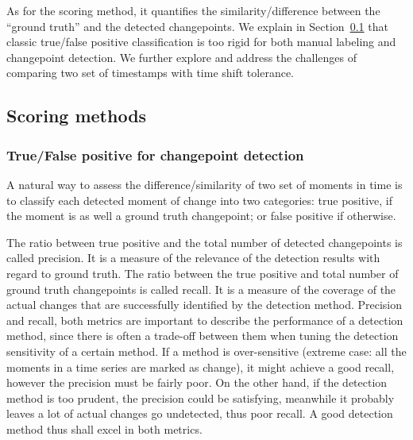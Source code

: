 As for the scoring method, it quantifies the similarity/difference between the ``ground truth'' and the detected changepoints.
We explain in Section~\ref{sec:score} that classic true/false positive classification is too rigid for both manual labeling and changepoint detection.
We further explore and address the challenges of comparing two set of timestamps with time shift tolerance.

\subsection{Scoring methods}
\label{sec:score}

\subsubsection{True/False positive for changepoint detection}

A natural way to assess the difference/similarity of two set of moments in time is to classify each detected moment of change into two categories: true positive, if the moment is as well a ground truth changepoint; or false positive if otherwise.

The ratio between true positive and the total number of detected changepoints is called precision.
It is a measure of the relevance of the detection results with regard to ground truth.
The ratio between the true positive and total number of ground truth changepoints is called recall.
It is a measure of the coverage of the actual changes that are successfully identified by the detection method.
Precision and recall, both metrics are important to describe the performance of a detection method, since there is often a trade-off between them when tuning the detection sensitivity of a certain method.
If a method is over-sensitive (extreme case: all the moments in a time series are marked as change), it might achieve a good recall,  however the precision must be fairly poor.
On the other hand, if the detection method is too prudent, the precision could be satisfying, meanwhile it probably leaves a lot of actual changes go undetected, thus poor recall.
A good detection method thus shall excel in both metrics.

